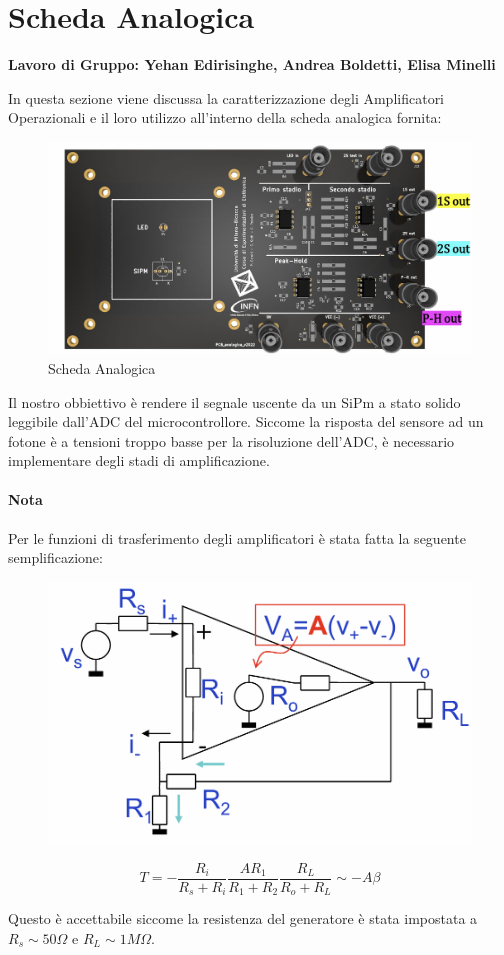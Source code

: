 \section{Scheda Analogica}
\textbf{Lavoro di Gruppo:   Yehan Edirisinghe,  Andrea Boldetti,    Elisa Minelli}

In questa sezione viene discussa la caratterizzazione degli Amplificatori Operazionali e il loro utilizzo all'interno della scheda analogica fornita:

\begin{figure}[!h]
    \centering
    \includegraphics[width=0.5\linewidth]{assets/scheda analogica/Scheda_Analogica.png}
    \caption{Scheda Analogica}
\end{figure}

Il nostro obbiettivo è rendere il segnale uscente da un SiPm a stato solido leggibile dall'ADC del microcontrollore. Siccome la risposta del sensore ad un fotone è a tensioni troppo basse per la risoluzione dell'ADC, è necessario implementare degli stadi di amplificazione.

\paragraph{Nota}
Per le funzioni di trasferimento degli amplificatori è stata fatta la seguente semplificazione:

\begin{figure}[!h]
    \centering
    \includegraphics[width=0.5\linewidth]{assets/scheda analogica/T(s)_Approx.png}
    \label{fig:enter-label}
\end{figure}

\[ T = -\frac{R_i}{R_s + R_i} \frac{AR_1}{R_1 + R_2} \frac{R_L}{R_o+R_L} \sim -A\beta \]

Questo è accettabile siccome la resistenza del generatore è stata impostata a $R_s \sim 50\Omega$ e $R_L \sim 1M\Omega$.



\newpage



